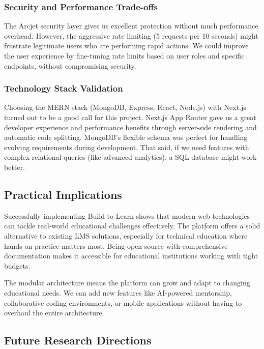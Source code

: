\documentclass[final,3p,times,twocolumn]{elsarticle}
\begin{document}
\subsubsection{Security and Performance Trade-offs}

The Arcjet security layer gives us excellent protection without much performance overhead. However, the aggressive rate limiting (5 requests per 10 seconds) might frustrate legitimate users who are performing rapid actions. We could improve the user experience by fine-tuning rate limits based on user roles and specific endpoints, without compromising security.

\subsubsection{Technology Stack Validation}

Choosing the MERN stack (MongoDB, Express, React, Node.js) with Next.js turned out to be a good call for this project. Next.js App Router gave us a great developer experience and performance benefits through server-side rendering and automatic code splitting. MongoDB's flexible schema was perfect for handling evolving requirements during development. That said, if we need features with complex relational queries (like advanced analytics), a SQL database might work better.

\subsection{Practical Implications}

Successfully implementing Build to Learn shows that modern web technologies can tackle real-world educational challenges effectively. The platform offers a solid alternative to existing LMS solutions, especially for technical education where hands-on practice matters most. Being open-source with comprehensive documentation makes it accessible for educational institutions working with tight budgets.

The modular architecture means the platform can grow and adapt to changing educational needs. We can add new features like AI-powered mentorship, collaborative coding environments, or mobile applications without having to overhaul the entire architecture.

\subsection{Future Research Directions}
\end{document}

